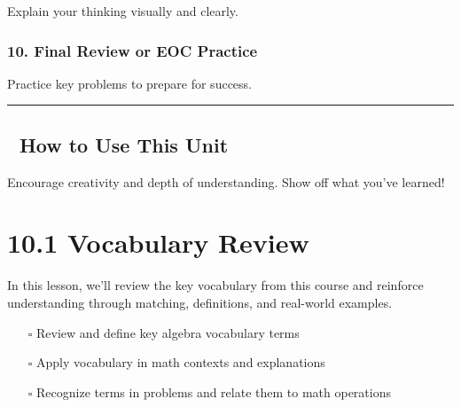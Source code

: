 \documentclass[
  letterpaper,
  DIV=11,
  numbers=noendperiod]{scrreprt}
\providecommand{\tightlist}{%
  \setlength{\itemsep}{0pt}\setlength{\parskip}{0pt}}
\begin{document}
Explain your thinking visually and clearly.

\subsection*{10. Final Review or EOC
Practice}\label{final-review-or-eoc-practice}

Practice key problems to prepare for success.

\begin{center}\rule{0.5\linewidth}{0.5pt}\end{center}

\section*{🧭 How to Use This Unit}\label{how-to-use-this-unit-7}


Encourage creativity and depth of understanding. Show off what you've
learned!

\chapter*{10.1 Vocabulary Review}\label{vocabulary-review-1}


In this lesson, we'll review the key vocabulary from this course and
reinforce understanding through matching, definitions, and real-world
examples.

\begin{tcolorbox}[enhanced jigsaw, left=2mm, opacityback=0, colback=white, rightrule=.15mm, toptitle=1mm, colframe=quarto-callout-note-color-frame, leftrule=.75mm, toprule=.15mm, breakable, bottomtitle=1mm, bottomrule=.15mm, colbacktitle=quarto-callout-note-color!10!white, arc=.35mm, opacitybacktitle=0.6, titlerule=0mm, coltitle=black, title={🎯 Objectives}]

\begin{itemize}
\tightlist
\item[$\square$]
  Review and define key algebra vocabulary terms
\item[$\square$]
  Apply vocabulary in math contexts and explanations
\item[$\square$]
  Recognize terms in problems and relate them to math operations
\end{itemize}

\end{tcolorbox}
\end{document}
